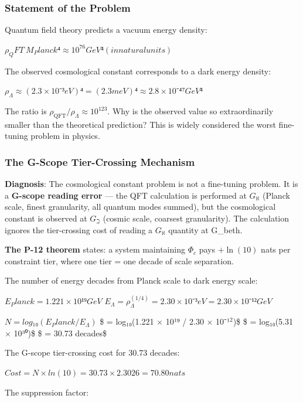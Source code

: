 \documentclass[12pt,a4paper]{article}
\begin{document}
\subsubsection{Statement of the Problem}

Quantum field theory predicts a vacuum energy density:

$\rho_QFT ~ M_Planck⁴  \approx  10^76 GeV⁴  (in natural units)$

The observed cosmological constant corresponds to a dark energy density:

$\rho_{\Lambda}  \approx  (2.3 \times 10⁻³ eV)⁴  =  (2.3 meV)⁴  \approx  2.8 \times 10⁻⁴⁷ GeV⁴$

The ratio is $\rho_{\text{QFT}} / \rho_{\Lambda} \approx 10^{123}$. Why is the observed value so extraordinarily smaller than the theoretical prediction? This is widely considered the worst fine-tuning problem in physics.

\subsubsection{The G-Scope Tier-Crossing Mechanism}

\textbf{Diagnosis}: The cosmological constant problem is not a fine-tuning problem. It is a \textbf{G-scope reading error} --- the QFT calculation is performed at $G_{\aleph}$ (Planck scale, finest granularity, all quantum modes summed), but the cosmological constant is observed at $G_{\beth}$ (cosmic scale, coarsest granularity). The calculation ignores the tier-crossing cost of reading a $G_{\aleph}$ quantity at G\_beth.

\textbf{The P-12 theorem} states: a system maintaining $\Phi_c$ pays $+\ln(10)$ nats per constraint tier, where one tier = one decade of scale separation.

The number of energy decades from Planck scale to dark energy scale:

$E_Planck  =  1.221 \times 10¹⁹ GeV$
$E_{\Lambda}       =  \rho_{\Lambda}^(1/4)  =  2.30 \times 10⁻³ eV  =  2.30 \times 10⁻¹² GeV$

$N = log₁₀(E_Planck / E_{\Lambda})$
\$ = log₁₀(1.221 $\times$ 10¹⁹ / 2.30 $\times$ 10⁻¹$^{2}$)\$
\$ = log₁₀(5.31 $\times$ 10³⁰)\$
\$ = 30.73 decades\$

The G-scope tier-crossing cost for 30.73 decades:

$Cost  =  N \times ln(10)  =  30.73 \times 2.3026  =  70.80 nats$

The suppression factor:
\end{document}
